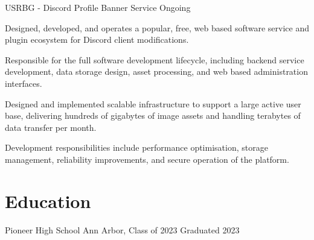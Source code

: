 \documentclass{../styles/resume}
\begin{document}
\subsectiondate
    {USRBG - Discord Profile Banner Service}
    {Ongoing}
\resumesublistbegin
    \item Designed, developed, and operates a popular, free, web based software service and plugin ecosystem for Discord client modifications.
    \item Responsible for the full software development lifecycle, including backend service development, data storage design, asset processing, and web based administration interfaces.
    \item Designed and implemented scalable infrastructure to support a large active user base, delivering hundreds of gigabytes of image assets and handling terabytes of data transfer per month.
    \item Development responsibilities include performance optimisation, storage management, reliability improvements, and secure operation of the platform.
\resumesublistend

\section{Education}
\subsectionlocationdate
    {Pioneer High School}
    {Ann Arbor, Class of 2023}
    {Graduated 2023}
\end{document}
